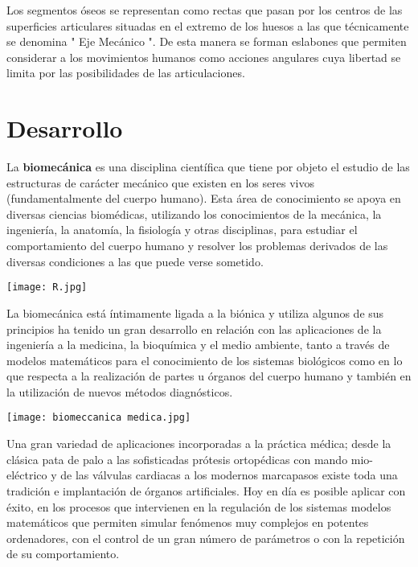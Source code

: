 \documentclass{article}
\begin{document}
Los segmentos óseos se representan como rectas que pasan por los centros de las superficies articulares situadas en el extremo de los huesos a las que técnicamente se denomina " Eje Mecánico ".    De esta manera se forman eslabones que permiten considerar a los movimientos humanos como acciones angulares cuya libertad se limita por las posibilidades de las articulaciones.
\clearpage

\section{Desarrollo}

 La \textbf {biomecánica} es una disciplina científica que tiene por objeto el estudio de las estructuras de carácter mecánico que existen en los seres vivos (fundamentalmente del cuerpo humano). Esta área de conocimiento se apoya en diversas ciencias biomédicas, utilizando los conocimientos de la mecánica, la ingeniería, la anatomía, la fisiología y otras disciplinas, para estudiar el comportamiento del cuerpo humano y resolver los problemas derivados de las diversas condiciones a las que puede verse sometido.
 
 \hspace{1cm}

\begin{minipage}{.89\linewidth} %
\centering
\texttt{[image: R.jpg]} %
\end{minipage}
 
\hspace{1cm} 

La biomecánica está íntimamente ligada a la biónica y utiliza algunos de sus principios ha tenido un gran desarrollo en relación con las aplicaciones de la ingeniería a la medicina, la bioquímica y el medio ambiente, tanto a través de modelos matemáticos para el conocimiento de los sistemas biológicos como en lo que respecta a la realización de partes u órganos del cuerpo humano y también en la utilización de nuevos métodos diagnósticos.



\hspace{1cm}

\begin{minipage}{.89\linewidth} %
\centering
\texttt{[image: biomeccanica medica.jpg]} %
\end{minipage}

\hspace{2cm}

Una gran variedad de aplicaciones incorporadas a la práctica médica; desde la clásica pata de palo a las sofisticadas prótesis ortopédicas con mando mio-eléctrico y de las válvulas cardiacas a los modernos marcapasos existe toda una tradición e implantación de órganos artificiales.
Hoy en día es posible aplicar con éxito, en los procesos que intervienen en la regulación de los sistemas modelos matemáticos que permiten simular fenómenos muy complejos en potentes ordenadores, con el control de un gran número de parámetros o con la repetición de su comportamiento.
\end{document}
